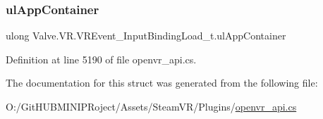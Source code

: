 \subsubsection{\texorpdfstring{ulAppContainer}{ulAppContainer}}
{\footnotesize\ttfamily ulong Valve.\+V\+R.\+V\+R\+Event\+\_\+\+Input\+Binding\+Load\+\_\+t.\+ul\+App\+Container}



Definition at line 5190 of file openvr\+\_\+api.\+cs.



The documentation for this struct was generated from the following file\+:\begin{DoxyCompactItemize}
\item 
O\+:/\+Git\+H\+U\+B\+M\+I\+N\+I\+P\+Roject/\+Assets/\+Steam\+V\+R/\+Plugins/\mbox{\hyperlink{openvr__api_8cs}{openvr\+\_\+api.\+cs}}\end{DoxyCompactItemize}
